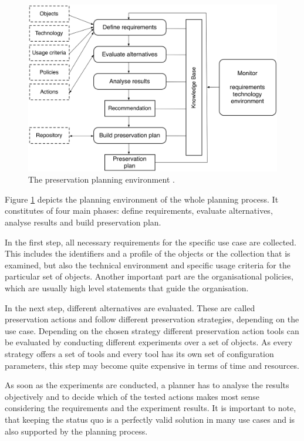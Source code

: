 \begin{figure}[th]
\begin{center}
\includegraphics[width=4.5in]{figures/related/planningenvironment.png}
\caption{The preservation planning environment \cite{Becker:2009fk}.}
\label{fig:planenv}
\end{center}
\end{figure}

Figure \ref{fig:planenv} depicts the planning environment of the whole planning process. It constitutes of four main phases: define requirements, evaluate alternatives, analyse results and build preservation plan.

In the first step, all necessary requirements for the specific use case are collected. This includes the identifiers and a profile of the objects or the collection that is examined, but also the technical environment and specific usage criteria for the particular set of objects. Another important part are the organisational policies, which are usually high level statements that guide the organisation.

In the next step, different alternatives are evaluated. These are called preservation actions and follow different preservation strategies, depending on the use case. Depending on the chosen
strategy different preservation action tools can be evaluated by conducting different experiments over a set of objects. As every strategy offers a set of tools and every tool has its own set of configuration parameters, this step may become quite expensive in terms of time and resources.

As soon as the experiments are conducted, a planner has to analyse the results objectively and to decide which of the tested actions makes most sense considering the requirements and the experiment results. It is important to note, that
keeping the status quo is a perfectly valid solution in many use cases and is also supported by the planning process.

